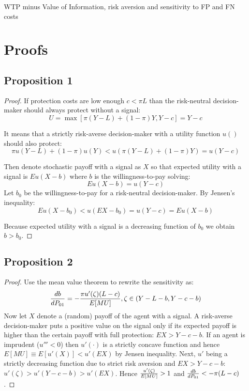 \documentclass[12pt,a4paper]{article}
\begin{document}
 \label{ip_tab}

 \label{wtp_dem}


\begin{table}[h!]
\caption{WTP minus Value of Information, risk aversion and sensitivity to FP and FN costs} \label{tab:wtp_risk}

\end{table}

%
%
%





\newpage
\section{Proofs}
\small

\subsection{Proposition 1}
\begin{proof} If protection costs are low enough $c<\pi L$ than the risk-neutral decision-maker should always protect without a signal:
$$U=\max[\pi(Y-L)+(1-\pi)Y,Y-c]=Y-c$$

It means that a strictly risk-averse decision-maker with a utility function $u()$ should also protect:
$$\pi u(Y-L)+(1-\pi)u(Y)<u(\pi(Y-L)+(1-\pi)Y)=u(Y-c)$$

Then denote stochastic payoff with a signal as $X$ so that expected utility with a signal is $Eu(X-b)$ where $b$ is the willingness-to-pay solving:
$$Eu(X-b)=u(Y-c)$$
 Let $b_0$ be the willingness-to-pay for a risk-neutral decision-maker. By Jensen's inequality:
$$Eu(X-b_0)<u(EX-b_0)=u(Y-c)=Eu(X-b)$$

Because expected utility with a signal is a decreasing function of $b_0$ we obtain $b>b_0$. \end{proof} 

\subsection{Proposition 2}
\begin{proof}
Use the mean value theorem to rewrite the sensitivity as:
$${db\over dP_{01}}=-{\pi u'(\zeta)(L-c)\over E[MU]},\zeta \in \left(Y-L-b, Y-c-b\right)$$
Now let $X$ denote a (random) payoff of the agent with a signal. A risk-averse decision-maker puts a positive value on the signal only if its expected payoff is higher than the certain payoff with full protection: $EX>Y-c-b$. If an agent is imprudent ($u'''<0$) then $u'(\cdot)$ is a strictly concave function and hence $E[MU]\equiv E[u'(X)]<u'(EX)$ by Jensen inequality. Next, $u'$ being a strictly decreasing function due to strict risk aversion and $EX>Y-c-b$: $u'(\zeta)>u'(Y-c-b)>u'(EX)$. Hence ${u'(\zeta)\over E[MU]}>1$ and ${db\over dP_{01}}<-\pi(L-c)$. 
\end{proof}
\end{document}
